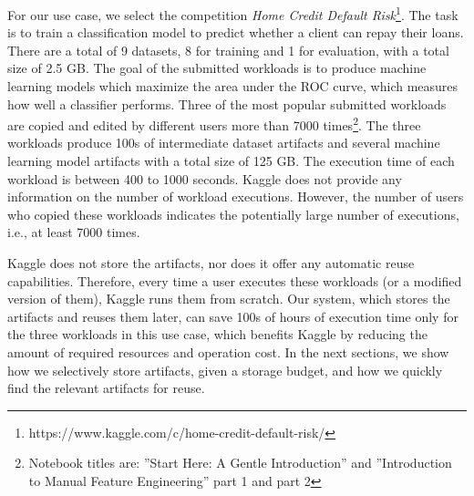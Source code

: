 For our use case, we select the competition \textit{Home Credit Default Risk}\footnote{https://www.kaggle.com/c/home-credit-default-risk/}.
The task is to train a classification model to predict whether a client can repay their loans.
There are a total of 9 datasets, 8 for training and 1 for evaluation, with a total size of 2.5 GB.
The goal of the submitted workloads is to produce machine learning models which maximize the area under the ROC curve, which measures how well a classifier performs.
Three of the most popular submitted workloads are copied and edited by different users more than 7000 times\footnote{Notebook titles are: ''Start Here: A Gentle Introduction'' and ''Introduction to Manual Feature Engineering'' part 1 and part 2}.
The three workloads produce 100s of intermediate dataset artifacts and several machine learning model artifacts with a total size of 125 GB.
The execution time of each workload is between 400 to 1000 seconds.
Kaggle does not provide any information on the number of workload executions.
However, the number of users who copied these workloads indicates the potentially large number of executions, i.e., at least 7000 times.

Kaggle does not store the artifacts, nor does it offer any automatic reuse capabilities.
Therefore, every time a user executes these workloads (or a modified version of them), Kaggle runs them from scratch.
Our system, which stores the artifacts and reuses them later, can save 100s of hours of execution time only for the three workloads in this use case, which benefits Kaggle by reducing the amount of required resources and operation cost.
In the next sections, we show how we selectively store artifacts, given a storage budget, and how we quickly find the relevant artifacts for reuse.